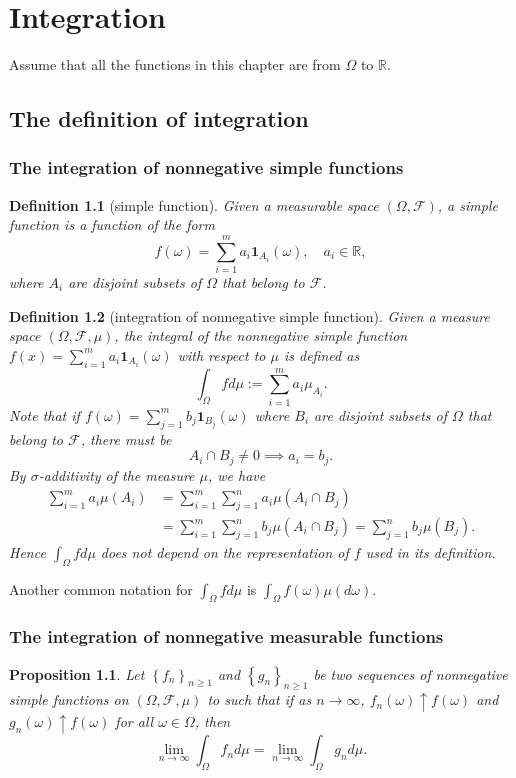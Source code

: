 \documentclass{report}
\newtheorem{definition}{Definition}[section]
\newtheorem{proposition}{Proposition}[section]
\theoremstyle{nonumberplain}
\begin{document}
\chapter{Integration}
Assume that all the functions in this chapter are from $\Omega$ to $\mathbb{R}$.
\section{The definition of integration}
\subsection{The integration of nonnegative simple functions}
\begin{definition}[simple function]
	Given a measurable space $(\Omega, \mathcal{F})$, a simple function is a function of the form
	\[
	f(\omega)=\sum_{i=1}^ma_i\mathbf{1}_{A_i}(\omega),\quad a_i\in\mathbb{R},
	\]
	where $A_i$ are disjoint subsets
	of $\Omega$ that belong to $\mathcal{F}$.
\end{definition}

\begin{definition}[integration of nonnegative simple function]
	Given a measure space $(\Omega, \mathcal{F},\mu)$, the integral of the nonnegative simple function $f(x)=\sum_{i=1}^ma_i\mathbf{1}_{A_i}(\omega)$ with respect to $\mu$
	is defined as
	\[
	\int_\Omega fd\mu:=\sum_{i=1}^ma_i\mu_{A_i}.
	\]
	Note that if $f(\omega)=\sum_{j=1}^mb_j\mathbf{1}_{B_j}(\omega)$ where $B_i$ are disjoint subsets
	of $\Omega$ that belong to $\mathcal{F}$, there must be
	\[
	A_{i} \cap B_{j} \neq 0\implies a_{i}=b_{j}.
	\]
	By $\sigma$-additivity of the measure $\mu$, we have
	\[
	\begin{aligned}
		\sum_{i=1}^{m} a_{i} \mu\left(A_{i}\right) &=\sum_{i=1}^{m} \sum_{j=1}^{n} a_{i} \mu\left(A_{i} \cap B_{j}\right) \\
		&=\sum_{i=1}^{m} \sum_{j=1}^{n} b_{j} \mu\left(A_{i} \cap B_{j}\right)=\sum_{j=1}^{n} b_{j} \mu\left(B_{j}\right).
	\end{aligned}
	\]
	Hence $\int_\Omega fd\mu$ does not depend on the representation of $f$ used in its definition. 
\end{definition}
Another common notation for $\int_\Omega fd\mu$ is $\int_\Omega f(\omega)\mu(d\omega)$.
\subsection{The integration of nonnegative measurable functions}
\begin{proposition}
	Let $\left\{f_{n}\right\}_{n \ge 1}$ and $\left\{g_{n}\right\}_{n \ge 1}$ be two sequences of nonnegative simple functions on $(\Omega, \mathcal{F}, \mu)$ to such that if as $n \rightarrow \infty$, $f_{n}(\omega) \uparrow f(\omega)$ and $g_{n}(\omega) \uparrow f(\omega)$ for all $\omega \in \Omega$, then
	\[
	\lim_{n \rightarrow \infty} \int_\Omega f_{n} d \mu=\lim _{n \rightarrow \infty} \int_\Omega g_{n} d \mu.
	\]
\end{proposition}
\end{document}
